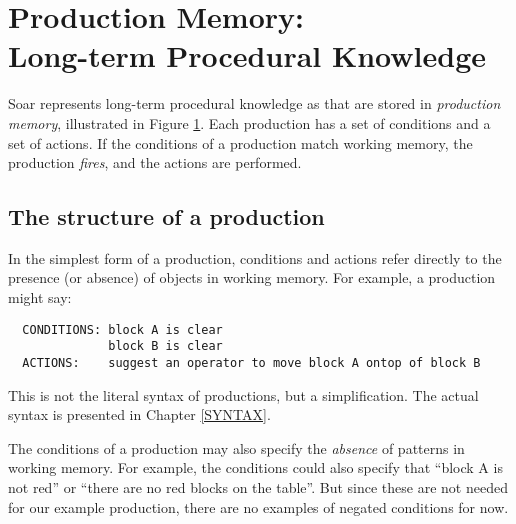 \section{\texorpdfstring{Production Memory:\\ Long-term Procedural Knowledge}{Production Memory: Long-term Procedural Knowledge}} 
\label{ARCH-pm}

\begin{figure}
	\label{fig:ab-prodmem}
\end{figure}

Soar represents long-term procedural knowledge as  that are stored in \emph{production memory}, illustrated in Figure \ref{fig:ab-prodmem}. Each production has a set of conditions and a set of actions.  If the conditions of a production match working memory, the production \emph{fires}, and the actions are performed.

\subsection{The structure of a production}
\label{ARCH-pm-structure}

In the simplest form of a production, conditions and actions refer directly to the presence (or absence) of objects in working memory. For example, a production might say:

\begin{verbatim}
  CONDITIONS: block A is clear 
              block B is clear 
  ACTIONS:    suggest an operator to move block A ontop of block B
\end{verbatim}

This is not the literal syntax of productions, but a simplification. The actual syntax is presented in Chapter \ref{SYNTAX}.

The conditions of a production may also specify the \emph{absence} of patterns in working memory. For example, the conditions could also specify that ``block A is not red'' or ``there are no red blocks on the table''. But since these are not needed for our example production, there are no examples of negated conditions for now.

